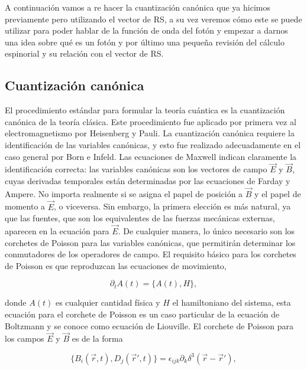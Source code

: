         A continuación vamos a re hacer la cuantización canónica que ya hicimos previamente pero utilizando el vector de RS, a su vez veremos cómo este se puede utilizar para poder hablar de la función de onda del fotón y empezar a darnos una idea sobre qué es un fotón y por último una pequeña revisión del cálculo espinorial y su relación con el vector de RS.
        \subsection{Cuantización canónica}

            El procedimiento estándar para formular la teoría cuántica es la cuantización canónica de la teoría clásica. Este procedimiento fue aplicado por primera vez al electromagnetismo por Heisenberg y Pauli. La cuantización canónica requiere la identificación de las variables canónicas, y esto fue realizado adecuadamente en el caso general por Born e Infeld. Las ecuaciones de Maxwell indican claramente la identificación correcta: las variables canónicas son los vectores de campo $\Vec{E}$ y $\Vec{B}$, cuyas derivadas temporales están determinadas por las ecuaciones de Farday y Ampere. No importa realmente si se asigna el papel de posición a $\Vec{B}$ y el papel de momento a $\Vec{E}$, o viceversa. Sin embargo, la primera elección es más natural, ya que las fuentes, que son los equivalentes de las fuerzas mecánicas externas, aparecen en la ecuación para $\Vec{E}$. De cualquier manera, lo único necesario son los corchetes de Poisson para las variables canónicas, que permitirán determinar los conmutadores de los operadores de campo. El requisito básico para los corchetes de Poisson es que reproduzcan las ecuaciones de movimiento,

            \begin{equation}\label{eq:PoissLiouville}
                \partial_t A(t) = \{A(t),H\},
            \end{equation}

            donde $A(t)$ es cualquier cantidad física y $H$ el hamiltoniano del sistema, esta ecuación para el corchete de Poisson es un caso particular de la ecuación de Boltzmann y se conoce como ecuación de Liouville. El corchete de Poisson para los campos $\Vec{E}$ y $\Vec{B}$ es de la forma

            \begin{equation}\label{eq:CorcPoisBi}
                \{B_i(\Vec{r},t), D_j(\Vec{r}',t)\} = \epsilon_{ijk}\partial_k \delta^3(\Vec{r}-\Vec{r}'),
            \end{equation}

